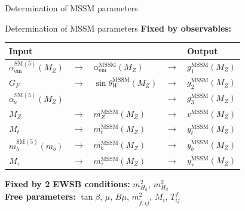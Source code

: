 \documentclass[hyperref={pdfpagelabels=false},ngerman]{beamer}
\renewcommand{\emph}{\textbf}
\newcommand{\SM}{\ensuremath{\text{SM}}}
\newcommand{\MSSM}{\ensuremath{\text{MSSM}}}
\begin{document}
\begin{frame}[noframenumbering]
  \begin{center}
    \Large Determination of MSSM parameters
  \end{center}
\end{frame}

\begin{frame}[noframenumbering]{Determination of MSSM parameters}
  \emph{Fixed by observables:}
  \begin{table}
    \centering
    \begin{tabular}{lllll}
      Input & & & & Output \\
      \midrule
      $\alpha_\text{em}^{\SM(5)}(M_Z)$ & $\rightarrow$ & $\alpha_\text{em}^\MSSM(M_Z)$ & $\rightarrow$ & $g_1^\MSSM(M_Z)$ \\
      $G_F$ & $\rightarrow$ & $\sin\theta_W^\MSSM(M_Z)$ & $\rightarrow$ & $g_2^\MSSM(M_Z)$ \\
      $\alpha_\text{s}^{\SM(5)}(M_Z)$ & & & $\rightarrow$ & $g_3^\MSSM(M_Z)$ \\
      $M_Z$ & $\rightarrow$ & $m_Z^\MSSM(M_Z)$ & $\rightarrow$ & $v^\MSSM(M_Z)$ \\
      $M_t$ & $\rightarrow$ & $m_t^\MSSM(M_Z)$ & $\rightarrow$ & $y_t^\MSSM(M_Z)$ \\
      $m_b^{\SM(5)}(m_b)$ & $\rightarrow$ & $m_b^\MSSM(M_Z)$ & $\rightarrow$ & $y_b^\MSSM(M_Z)$ \\
      $M_\tau$ & $\rightarrow$ & $m_\tau^\MSSM(M_Z)$ & $\rightarrow$ & $y_\tau^\MSSM(M_Z)$ \\
    \end{tabular}
  \end{table}
  \emph{Fixed by 2 EWSB conditions:} $m^2_{H_u}$, $m^2_{H_d}$ \\[1em]
  \emph{Free parameters:} $\tan\beta$, $\mu$, $B\mu$, $m_{\tilde{f},ij}^2$, $M_i$,
  $T^f_{ij}$
\end{frame}
\end{document}
